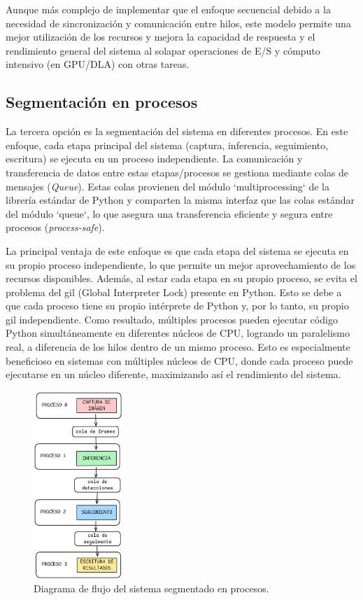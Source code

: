 \documentclass[11pt,spanish,listoffigures,listoftables]{tfgetsinf}
\begin{document}
Aunque más complejo de implementar que el enfoque secuencial debido a la necesidad de sincronización y comunicación entre hilos, este modelo permite una mejor utilización de los recursos y mejora la capacidad de respuesta y el rendimiento general del sistema al solapar operaciones de E/S y cómputo intensivo (en GPU/DLA) con otras tareas.

\subsection{Segmentación en procesos} \label{sub:segmentacion_procesos}

La tercera opción es la segmentación del sistema en diferentes procesos. En este enfoque, cada etapa principal del sistema (captura, inferencia, seguimiento, escritura) se ejecuta en un proceso independiente. La comunicación y transferencia de datos entre estas etapas/procesos se gestiona mediante colas de mensajes (\textit{Queue}). Estas colas provienen del módulo `multiprocessing` de la librería estándar de Python y comparten la misma interfaz que las colas estándar del módulo `queue`, lo que asegura una transferencia eficiente y segura entre procesos (\textit{process-safe}).

La principal ventaja de este enfoque es que cada etapa del sistema se ejecuta en su propio proceso independiente, lo que permite un mejor aprovechamiento de los recursos disponibles. Además, al estar cada etapa en su propio proceso, se evita el problema del \gls{gil} (Global Interpreter Lock) presente en Python. Esto se debe a que cada proceso tiene su propio intérprete de Python y, por lo tanto, su propio \gls{gil} independiente. Como resultado, múltiples procesos pueden ejecutar código Python simultáneamente en diferentes núcleos de CPU, logrando un paralelismo real, a diferencia de los hilos dentro de un mismo proceso. Esto es especialmente beneficioso en sistemas con múltiples núcleos de CPU, donde cada proceso puede ejecutarse en un núcleo diferente, maximizando así el rendimiento del sistema.

\begin{figure}[H]
   \centering
   \includegraphics[width=0.3\textwidth]{images/diseno_e_implementacion/segmentacion_procesos.png}
   \caption[Diagrama de flujo del sistema segmentado en procesos]{Diagrama de flujo del sistema segmentado en procesos.}
   \label{fig:procesos}
\end{figure}
\end{document}
